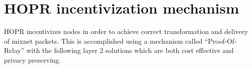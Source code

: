 \section{HOPR incentivization mechanism}
HOPR incentivizes nodes in order to achieve correct transformation and delivery of mixnet packets.
This is accomplished using a mechanism called “Proof-Of-Relay” with the following layer 2 solutions which are both cost effective and privacy preserving.





